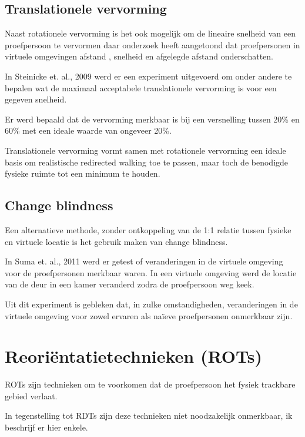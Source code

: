\subsection{Translationele vervorming}
Naast rotationele vervorming is het ook mogelijk om de lineaire snelheid van een
proefpersoon te vervormen daar onderzoek heeft aangetoond dat proefpersonen in 
virtuele omgevingen afstand \cite{loomis03}, snelheid \cite{banton05} en 
afgelegde afstand \cite{frenz07} onderschatten.

In Steinicke et. al., 2009 \cite{steinicke09} werd er een experiment uitgevoerd 
om onder andere te bepalen wat de maximaal acceptabele translationele vervorming 
is voor een gegeven snelheid.

Er werd bepaald dat de vervorming merkbaar is bij een versnelling tussen 20\% en
60\% met een ideale waarde van ongeveer 20\%.

Translationele vervorming vormt samen met rotationele vervorming een ideale basis 
om realistische redirected walking toe te passen, maar toch de benodigde fysieke 
ruimte tot een minimum te houden.


\subsection{Change blindness}
Een alternatieve methode, zonder ontkoppeling van de 1:1 relatie tussen fysieke 
en virtuele locatie is het gebruik maken van change blindness.

In Suma et. al., 2011 \cite{suma11} werd er getest of veranderingen in de 
virtuele omgeving voor de proefpersonen merkbaar waren. In een virtuele omgeving 
werd de locatie van de deur in een kamer veranderd zodra de proefpersoon weg 
keek.

Uit dit experiment is gebleken dat, in zulke omstandigheden, veranderingen in de
virtuele omgeving voor zowel ervaren als na\"ieve proefpersonen onmerkbaar zijn.


\section{Reori\"entatietechnieken (ROTs)}
ROTs zijn technieken om te voorkomen dat de proefpersoon het fysiek trackbare 
gebied verlaat.

In tegenstelling tot RDTs zijn deze technieken niet noodzakelijk onmerkbaar, ik
beschrijf er hier enkele.


